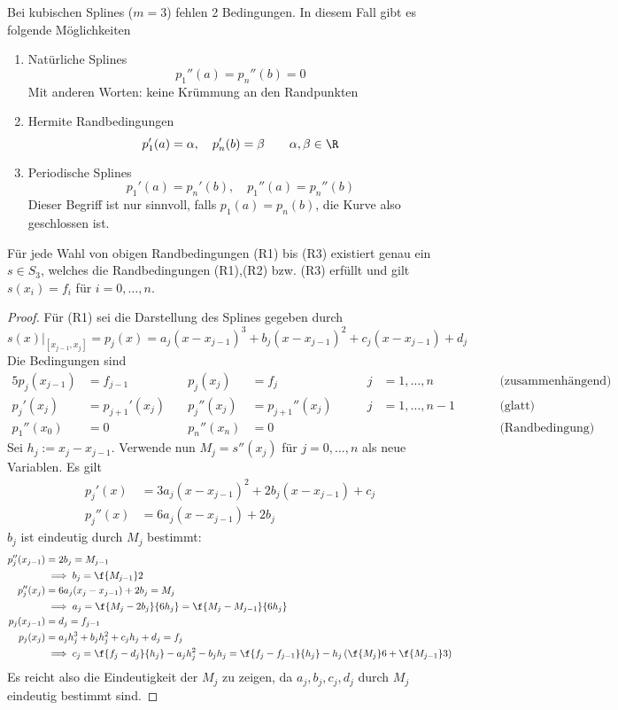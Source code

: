 \documentclass[11pt]{scrbook}
\begin{document}
Bei kubischen Splines ($m=3$) fehlen 2 Bedingungen.
In diesem Fall gibt es folgende Möglichkeiten
\begin{enumerate}[{(R}1{)}]
	\item
		Natürliche Splines
		\[
			p_1''(a) = p_n''(b)=0
		\]
		Mit anderen Worten: keine Krümmung an den Randpunkten
	\item
		Hermite Randbedingungen
		\[
			p_1'(a) = \alpha, \quad p_n'(b) = \beta \qquad \alpha,\beta\in \R
		\]
	\item
		Periodische Splines
		\[
			p_1'(a) = p_n'(b), \quad p_1''(a) = p_n''(b)
		\]
		Dieser Begriff ist nur sinnvoll, falls $p_1(a) = p_n(b)$, die Kurve also geschlossen ist.
\end{enumerate}

\begin{st}
	\label{1.32}
	Für jede Wahl von obigen Randbedingungen (R1) bis (R3) existiert genau ein $s\in S_3$, welches die Randbedingungen (R1),(R2) bzw. (R3) erfüllt und gilt $s(x_i)=f_i$ für $i=0,\dotsc,n$.
	\begin{proof}
		Für (R1) sei die Darstellung des Splines gegeben durch
		\[
			s(x)\big|_{[x_{j-1},x_j]} = p_j(x) = a_j(x-x_{j-1})^3 + b_j(x-x_{j-1})^2 + c_j(x-x_{j-1}) + d_j
		\]
		Die Bedingungen sind
		\begin{alignat*}{5}
			p_j(x_{j-1}) &= f_{j-1}& \quad p_j(x_j) &= f_j & \qquad j&=1,\dotsc,n & &\qquad \text{(zusammenhängend)} &\\
			p_j'(x_j) &= p_{j+1}'(x_j) & \quad p_j''(x_j) &= p_{j+1}''(x_j) &  \qquad j&=1,\dotsc,n-1 & &\qquad \text{(glatt)} &\\
			p_1''(x_0)&=0& \quad p_n''(x_n) &= 0 & & & &\qquad \text{(Randbedingung)} &
		\end{alignat*}
		Sei $h_j := x_j - x_{j-1}$.
		Verwende nun $M_j = s''(x_j)$ für $j=0,\dotsc,n$ als neue Variablen.
		Es gilt
		\begin{align*}
			p_j'(x) &= 3a_j(x-x_{j-1})^2 + 2b_j(x-x_{j-1})+c_j \\
			p_j''(x) &= 6a_j(x-x_{j-1}) + 2b_j
		\end{align*}
		$b_j$ ist eindeutig durch $M_j$ bestimmt:
		\begin{align*}
			p_j''(x_{j-1}) 
				&= 2b_j 
				= M_{j-1}  \\
				&\implies b_j
					=\f {M_{j-1}}2 \\
			p_j''(x_j) 
				&= 6a_j(x_j-x_{j-1}) + 2b_j 
				= M_j \\
				&\implies a_j 
					= \f {M_j - 2b_j}{6h_j} 
					= \f {M_j - M_{j-1}}{6h_j} \\
			p_j(x_{j-1}) 
				&= d_j 
				= f_{j-1} \\
			p_j(x_j) 
				&= a_j h_j^3 + b_jh_j^2 + c_jh_j + d_j 
				= f_j \\
				&\implies c_j 
					= \f{f_j-d_j}{h_j} - a_jh_j^2 - b_jh_j 
					= \f {f_j-f_{j-1}}{h_j} - h_j\left(\f {M_j}6 + \f{M_{j-1}}3 \right)
		\end{align*}
		Es reicht also die Eindeutigkeit der $M_j$ zu zeigen, da $a_j,b_j,c_j,d_j$ durch $M_j$ eindeutig bestimmt sind.


\end{proof}
\end{st}
\end{document}
